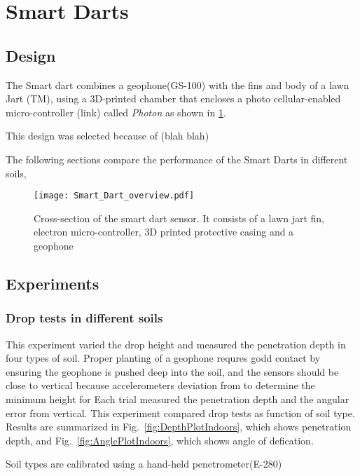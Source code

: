 \section{Smart Darts}\label{sec:SmartDarts}

\subsection{Design}
The Smart dart combines a geophone(GS-100) with the fins and body of a lawn Jart (TM), using a 3D-printed chamber that encloses a photo cellular-enabled micro-controller (link) called \emph{Photon} as shown in \ref{fig:Smart_Dart_overview}.

This design was selected because of (blah blah)

The following sections compare the performance of the Smart Darts in different soils, 

\begin{figure} \centering
{\texttt{[image: Smart\_Dart\_overview.pdf]}}
\caption{Cross-section of the smart dart sensor. It consists of a lawn jart fin, electron micro-controller, 3D printed protective casing and a geophone} 
\label{fig:Smart_Dart_overview}
\end{figure}

\subsection{Experiments}
\subsubsection{ Drop tests in different soils} 
This experiment varied the drop height and measured the penetration depth in four types of soil.
Proper planting of a geophone requres godd contact by ensuring the geophone is pushed deep into the soil, and the sensors should be close to vertical because accelerometers
deviation from 
 to determine the minimum height for
Each trial measured the penetration depth and the angular error from vertical.
This experiment compared drop tests as function of soil type.  
Results are summarized in Fig.~\ref{fig:DepthPlotIndoors}, which shows penetration depth, and Fig.~\ref{fig:AnglePlotIndoors}, which shows angle of defication.

Soil types are calibrated using a hand-held penetrometer(E-280)

